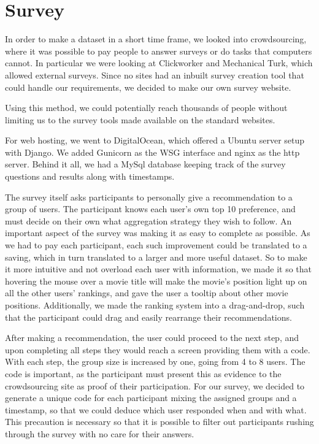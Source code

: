 \section{Survey}

In order to make a dataset in a short time frame, we looked into crowdsourcing, where it was possible to pay people to answer surveys or do tasks that computers cannot. In particular we were looking at Clickworker and Mechanical Turk, which allowed external surveys. Since no sites had an inbuilt survey creation tool that could handle our requirements, we decided to make our own survey website.

Using this method, we could potentially reach thousands of people without limiting us to the survey tools made available on the standard websites.

For web hosting, we went to DigitalOcean, which offered a Ubuntu server setup with Django. We added Gunicorn as the WSG interface and nginx as the http server. Behind it all, we had a MySql database keeping track of the survey questions and results along with timestamps.


The survey itself asks participants to personally give a recommendation to a group of users. The participant knows each user's own top 10 preference, and must decide on their own what aggregation strategy they wish to follow. An important aspect of the survey was making it as easy to complete as possible. As we had to pay each participant, each such improvement could be translated to a saving, which in turn translated to a larger and more useful dataset. So to make it more intuitive and not overload each user with information, we made it so that hovering the mouse over a movie title will make the movie's position light up on all the other users' rankings, and gave the user a tooltip about other movie positions. Additionally, we made the ranking system into a drag-and-drop, such that the participant could drag and easily rearrange their recommendations.

After making a recommendation, the user could proceed to the next step, and upon completing all steps they would reach a screen providing them with a code. With each step, the group size is increased by one, going from 4 to 8 users. The code is important, as the participant must present this as evidence to the crowdsourcing site as proof of their participation. For our survey, we decided to generate a unique code for each participant mixing the assigned groups and a timestamp, so that we could deduce which user responded when and with what. This precaution is necessary so that it is possible to filter out participants rushing through the survey with no care for their answers.

